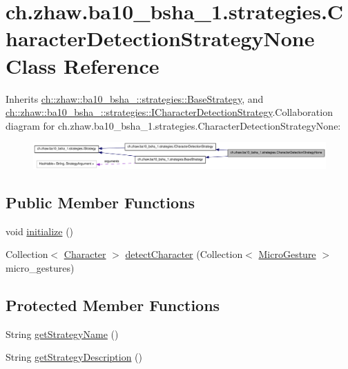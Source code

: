 \hypertarget{classch_1_1zhaw_1_1ba10__bsha__1_1_1strategies_1_1CharacterDetectionStrategyNone}{
\section{ch.zhaw.ba10\_\-bsha\_\-1.strategies.CharacterDetectionStrategyNone Class Reference}
\label{classch_1_1zhaw_1_1ba10__bsha__1_1_1strategies_1_1CharacterDetectionStrategyNone}
}


Inherits \hyperlink{classch_1_1zhaw_1_1ba10__bsha__1_1_1strategies_1_1BaseStrategy}{ch::zhaw::ba10\_\-bsha\_::strategies::BaseStrategy}, and \hyperlink{interfacech_1_1zhaw_1_1ba10__bsha__1_1_1strategies_1_1ICharacterDetectionStrategy}{ch::zhaw::ba10\_\-bsha\_::strategies::ICharacterDetectionStrategy}.Collaboration diagram for ch.zhaw.ba10\_\-bsha\_\-1.strategies.CharacterDetectionStrategyNone:\nopagebreak
\begin{figure}[H]
\begin{center}
\leavevmode
\includegraphics[width=400pt]{classch_1_1zhaw_1_1ba10__bsha__1_1_1strategies_1_1CharacterDetectionStrategyNone__coll__graph}
\end{center}
\end{figure}
\subsection*{Public Member Functions}
\begin{DoxyCompactItemize}
\item 
void \hyperlink{classch_1_1zhaw_1_1ba10__bsha__1_1_1strategies_1_1CharacterDetectionStrategyNone_ab1d3f026d9f5488286261d2dde224bde}{initialize} ()
\item 
Collection$<$ \hyperlink{classch_1_1zhaw_1_1ba10__bsha__1_1_1Character}{Character} $>$ \hyperlink{classch_1_1zhaw_1_1ba10__bsha__1_1_1strategies_1_1CharacterDetectionStrategyNone_adb39d671e0a059ace4a695a03ef53906}{detectCharacter} (Collection$<$ \hyperlink{classch_1_1zhaw_1_1ba10__bsha__1_1_1service_1_1MicroGesture}{MicroGesture} $>$ micro\_\-gestures)
\end{DoxyCompactItemize}
\subsection*{Protected Member Functions}
\begin{DoxyCompactItemize}
\item 
String \hyperlink{classch_1_1zhaw_1_1ba10__bsha__1_1_1strategies_1_1CharacterDetectionStrategyNone_a9ee9165c5f2511331b3defaa48d35b4c}{getStrategyName} ()
\item 
String \hyperlink{classch_1_1zhaw_1_1ba10__bsha__1_1_1strategies_1_1CharacterDetectionStrategyNone_a77ffbdb8eb70ff5517bb8821a2c23572}{getStrategyDescription} ()
\end{DoxyCompactItemize}


